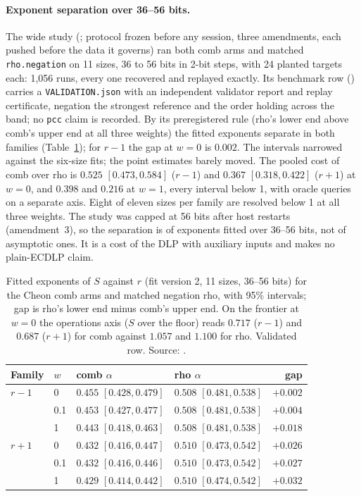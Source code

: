 \paragraph{Exponent separation over 36--56 bits.} The wide study
(; protocol frozen
before any session, three amendments, each pushed before the data it
governs) ran both comb arms and matched \texttt{rho.negation} on 11 sizes,
36 to 56 bits in 2-bit steps, with 24 planted targets each: 1{,}056 runs,
every one recovered and replayed exactly. Its benchmark row
() carries a \texttt{VALIDATION.json}
with an independent validator report and replay certificate, negation the
strongest reference and the order holding across the band; no \texttt{pcc}
claim is recorded. By its preregistered rule (rho's lower end above comb's
upper end at all three weights) the fitted exponents separate in both
families (Table~\ref{tab:gf-cheon-wide}); for $r-1$ the gap at $w=0$ is
$0.002$. The intervals narrowed against the six-size fits; the point
estimates barely moved. The pooled cost of comb over rho is $0.525$
$[0.473,0.584]$ ($r-1$) and $0.367$ $[0.318,0.422]$ ($r+1$) at $w=0$, and
$0.398$ and $0.216$ at $w=1$, every interval below 1, with oracle queries
on a separate axis. Eight of eleven sizes per family are resolved below 1
at all three weights. The study was capped at 56 bits after host restarts
(amendment~3), so the separation is of exponents fitted over 36--56 bits,
not of asymptotic ones. It is a cost of the DLP with auxiliary inputs and
makes no plain-ECDLP claim.

\begin{table}[t]
\centering\small
\begin{tabular}{@{}llllr@{}}
\toprule
Family & $w$ & comb $\alpha$ & rho $\alpha$ & gap \\
\midrule
$r-1$ & 0 & $0.455$ $[0.428,0.479]$ & $0.508$ $[0.481,0.538]$ & $+0.002$ \\
 & 0.1 & $0.453$ $[0.427,0.477]$ & $0.508$ $[0.481,0.538]$ & $+0.004$ \\
 & 1 & $0.443$ $[0.418,0.463]$ & $0.508$ $[0.481,0.538]$ & $+0.018$ \\
$r+1$ & 0 & $0.432$ $[0.416,0.447]$ & $0.510$ $[0.473,0.542]$ & $+0.026$ \\
 & 0.1 & $0.432$ $[0.416,0.446]$ & $0.510$ $[0.473,0.542]$ & $+0.027$ \\
 & 1 & $0.429$ $[0.414,0.442]$ & $0.510$ $[0.474,0.542]$ & $+0.032$ \\
\bottomrule
\end{tabular}
\caption[]{Fitted exponents of $S$ against $r$ (fit version 2, 11 sizes,
36--56 bits) for the Cheon comb arms and matched negation rho, with 95\%
intervals; gap is rho's lower end minus comb's upper end. On the frontier
at $w=0$ the operations axis ($S$ over the floor) reads $0.717$ ($r-1$) and
$0.687$ ($r+1$) for comb against $1.057$ and $1.100$ for rho. Validated row. Source:
.}
\label{tab:gf-cheon-wide}
\end{table}

